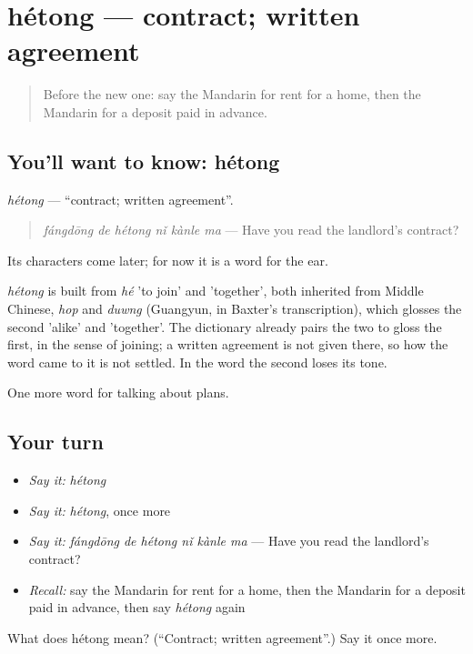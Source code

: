 \section[hétong]{hétong — contract; written agreement}

\label{lesson:ZH-C203-hetong}



\begin{quote}
Before the new one: say the Mandarin for rent for a home, then the Mandarin for a deposit paid in advance.
\end{quote}

\subsection*{You'll want to know: hétong}
\emph{hétong} — \textquotedblleft{}contract; written agreement\textquotedblright{}.

\begin{quote}
\emph{fángdōng de hétong nǐ kànle ma} — Have you read the landlord's contract?
\end{quote}

Its characters come later; for now it is a word for the ear.

\begin{cousinweb}
\emph{hétong} is built from \emph{hé} 'to join' and  'together', both inherited from Middle Chinese, \emph{hop} and \emph{duwng} (Guangyun, in Baxter's transcription), which glosses the second 'alike' and 'together'. The dictionary already pairs the two to gloss the first, in the sense of joining; a written agreement is not given there, so how the word came to it is not settled. In the word the second loses its tone.
\end{cousinweb}

\begin{grammarlens}[title={What you've built}]
One more word for talking about plans.
\end{grammarlens}

\subsection*{Your turn}
\begin{itemize}
\raggedright
  \item \emph{Say it:} \emph{hétong}
  \item \emph{Say it:} \emph{hétong}, once more
  \item \emph{Say it:} \emph{fángdōng de hétong nǐ kànle ma} — Have you read the landlord's contract?
  \item \emph{Recall:} say the Mandarin for rent for a home, then the Mandarin for a deposit paid in advance, then say \emph{hétong} again
\end{itemize}

\begin{tcolorbox}[breakable,colback=teal!4,colframe=teal!35!black,title={Before you move on}]
What does hétong mean? (\textquotedblleft{}Contract; written agreement\textquotedblright{}.) Say it once more.
\end{tcolorbox}
